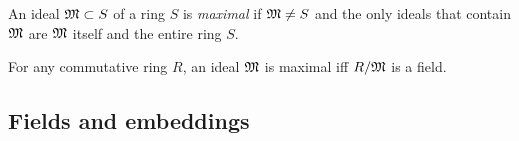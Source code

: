\begin{defn}
	An ideal $\mathfrak{M}\subset S$ of a ring $S$ is \emph{maximal} if $\mathfrak{M}\neq S$ and the only ideals that contain $\mathfrak{M}$ are $\mathfrak{M}$ itself and the entire ring $S$.
\end{defn}

\begin{prop}
	For any commutative ring $R$, an ideal $\mathfrak{M}$ is maximal iff $R/\mathfrak{M}$ is a field.
\end{prop}




\subsection{Fields and embeddings}







